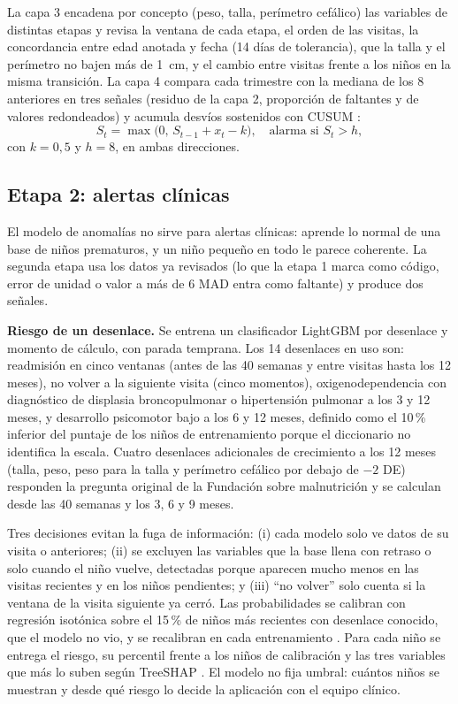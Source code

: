 La capa 3 encadena por concepto (peso, talla, perímetro cefálico) las variables de distintas etapas y revisa la ventana de cada etapa, el orden de las visitas, la concordancia entre edad anotada y fecha (14 días de tolerancia), que la talla y el perímetro no bajen más de 1~cm, y el cambio entre visitas frente a los niños en la misma transición. La capa 4 compara cada trimestre con la mediana de los 8 anteriores en tres señales (residuo de la capa 2, proporción de faltantes y de valores redondeados) y acumula desvíos sostenidos con CUSUM \cite{page1954}:
\begin{equation}
S_t = \max\bigl(0,\, S_{t-1} + x_t - k\bigr), \quad \text{alarma si } S_t > h,
\label{eq:cusum}
\end{equation}
con $k = 0{,}5$ y $h = 8$, en ambas direcciones.

\subsection{Etapa 2: alertas clínicas}
\label{sec:met-clinico}
El modelo de anomalías no sirve para alertas clínicas: aprende lo normal de una base de niños prematuros, y un niño pequeño en todo le parece coherente. La segunda etapa usa los datos ya revisados (lo que la etapa 1 marca como código, error de unidad o valor a más de 6 MAD entra como faltante) y produce dos señales.

\textbf{Riesgo de un desenlace.} Se entrena un clasificador LightGBM por desenlace y momento de cálculo, con parada temprana. Los 14 desenlaces en uso son: readmisión en cinco ventanas (antes de las 40 semanas y entre visitas hasta los 12 meses), no volver a la siguiente visita (cinco momentos), oxigenodependencia con diagnóstico de displasia broncopulmonar o hipertensión pulmonar a los 3 y 12 meses, y desarrollo psicomotor bajo a los 6 y 12 meses, definido como el 10\,\% inferior del puntaje de los niños de entrenamiento porque el diccionario no identifica la escala. Cuatro desenlaces adicionales de crecimiento a los 12 meses (talla, peso, peso para la talla y perímetro cefálico por debajo de $-2$ DE) responden la pregunta original de la Fundación sobre malnutrición y se calculan desde las 40 semanas y los 3, 6 y 9 meses.

Tres decisiones evitan la fuga de información: (i) cada modelo solo ve datos de su visita o anteriores; (ii) se excluyen las variables que la base llena con retraso o solo cuando el niño vuelve, detectadas porque aparecen mucho menos en las visitas recientes y en los niños pendientes; y (iii) ``no volver'' solo cuenta si la ventana de la visita siguiente ya cerró. Las probabilidades se calibran con regresión isotónica sobre el 15\,\% de niños más recientes con desenlace conocido, que el modelo no vio, y se recalibran en cada entrenamiento \cite{vancalster2019}. Para cada niño se entrega el riesgo, su percentil frente a los niños de calibración y las tres variables que más lo suben según TreeSHAP \cite{lundberg2020}. El modelo no fija umbral: cuántos niños se muestran y desde qué riesgo lo decide la aplicación con el equipo clínico.

